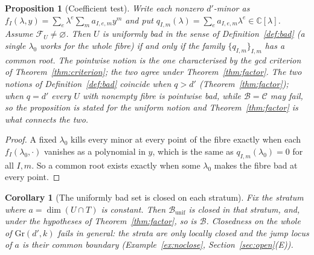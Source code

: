 \documentclass[journal]{IEEEtran}
\theoremstyle{plainn}
\newtheorem{prop}[thm]{Proposition}
\newtheorem{cor}[thm]{Corollary}
\theoremstyle{remark}
\begin{document}
\begin{prop}[Coefficient test]\label{prop:coeff}
Write each nonzero $d'$-minor as $f_I(\lambda,y)=\sum_e\lambda^{e}\sum_m a_{I,e,m}y^{m}$ and put
$q_{I,m}(\lambda)=\sum_e a_{I,e,m}\lambda^{e}\in\mathbb C[\lambda]$. Assume $\mathcal F_U\ne\varnothing$. Then $U$ is \emph{uniformly} bad in the sense of
Definition~\ref{def:bad} (a single $\lambda_0$ works for the whole fibre) if and only if the family
$\{q_{I,m}\}_{I,m}$ has a common root. The pointwise notion is the one characterised by the gcd
criterion of Theorem~\ref{thm:criterion}; the two agree under Theorem~\ref{thm:factor}. The two notions of
Definition~\ref{def:bad} coincide when $q>d'$ (Theorem~\ref{thm:factor}); when $q=d'$ every $U$ with
nonempty fibre is pointwise bad, while $\mathcal B=\mathcal C$ may fail, so the proposition is stated for the
uniform notion and Theorem~\ref{thm:factor} is what connects the two.
\end{prop}

\begin{proof}
A fixed $\lambda_0$ kills every minor at every point of the fibre exactly when each
$f_I(\lambda_0,\cdot)$ vanishes as a polynomial in $y$, which is the same as
$q_{I,m}(\lambda_0)=0$ for all $I,m$. So a common root exists exactly when some $\lambda_0$ makes the
fibre bad at every point.
\end{proof}

\begin{cor}[The uniformly bad set is closed on each stratum]\label{cor:closed}
Fix the stratum where $a=\dim(U\cap T)$ is constant. Then $\mathcal B_{\mathrm{unif}}$ is closed in that
stratum, and, under the hypotheses of Theorem~\ref{thm:factor}, so is $\mathcal B$. Closedness on the whole
of $\mathrm{Gr}(d',k)$ fails in general: the strata are only locally closed and the jump locus of $a$ is
their common boundary (Example~\ref{ex:noclose}, Section~\ref{sec:open}(E)).
\end{cor}
\end{document}

